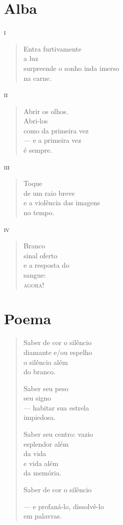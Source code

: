 \chapter{Alba}

\forceindent\textsc{i}

\begin{verse}
Entra furtivamente\\
a luz\\
surpreende o sonho inda imerso\\
\qquad\qquad\qquad\qquad\quad na carne.
\end{verse}

\medskip
\textsc{ii}

\begin{verse}
Abrir os olhos.\\
Abri-los\\
como da primeira vez\\
--- e a primeira vez\\
\quad é sempre.
\end{verse}

\medskip
\textsc{iii}\\

\begin{verse}
Toque\\
de um raio breve\\
e a violência das imagens\\
no tempo.
\end{verse}

\pagebreak
\textsc{iv}

\begin{verse}
Branco\\
sinal oferto\\
e a resposta do\\
sangue:\\
\textsc{agora!}
\end{verse}


\chapter{Poema}

\begin{verse}
Saber de cor o silêncio\\
diamante e/ou espelho\\
o silêncio além\\
do branco.

Saber seu peso\\
seu signo\\
--- habitar sua estrela\\
\quad impiedosa.

Saber seu centro: vazio\\
esplendor além\\
da vida\\
e vida além\\
da memória.

Saber de cor o silêncio

--- e profaná-lo, dissolvê-lo\\
\qquad\qquad\qquad em palavras.
\end{verse}

